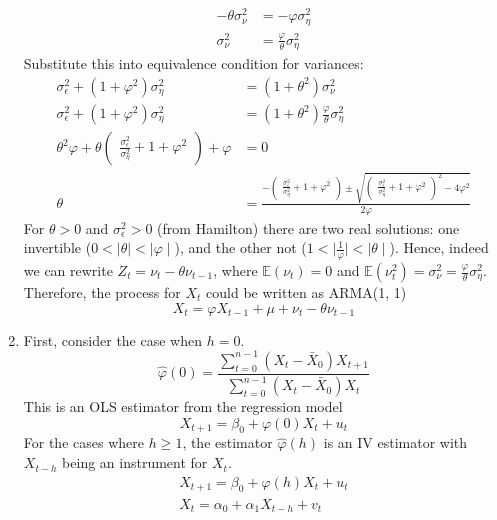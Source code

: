 \documentclass[]{article}
\begin{document}
\begin{enumerate}[label=\alph*)]
\begin{equation}
		\begin{split}
		-\theta\sigma_\nu^2& = -\varphi\sigma_\eta^2 \\ \nonumber
		\sigma_\nu^2& = \frac{\varphi}{\theta}\sigma_\eta^2
		\end{split}
	\end{equation}
	Substitute this into equivalence condition for variances:
	\begin{equation}
		\begin{split}
		\sigma_\epsilon^2 + (1+\varphi^2)\sigma_\eta^2& = (1+\theta^2)\sigma_\nu^2 \\ \nonumber
		\sigma_\epsilon^2 + (1+\varphi^2)\sigma_\eta^2& = (1+\theta^2)\frac{\varphi}{\theta}\sigma_\eta^2 \\
		\theta^2 \varphi + \theta\begin{pmatrix}
		\frac{\sigma_\epsilon^2}{\sigma_\eta^2} + 1 + \varphi^2
		\end{pmatrix} + \varphi& = 0 \\
		\theta& = \frac{-\begin{pmatrix}
			\frac{\sigma_\epsilon^2}{\sigma_\eta^2} + 1 + \varphi^2
			\end{pmatrix} \pm \sqrt{\begin{pmatrix}
				\frac{\sigma_\epsilon^2}{\sigma_\eta^2} + 1 + \varphi^2
				\end{pmatrix}^2 - 4\varphi^2}}{2\varphi}
		\end{split}
	\end{equation}
	For $\theta>0$ and $\sigma_\epsilon^2 > 0$ (from Hamilton) there are two real solutions: one invertible ($0 < \mid\theta\mid < \mid\varphi\mid$), and the other not ($1 < \mid\frac{1}{\varphi}\mid < \mid\theta\mid$). Hence, indeed we can rewrite $Z_t = \nu_t - \theta\nu_{t-1}$, where $\mathbb{E}(\nu_t) = 0$ and $\mathbb{E}(\nu_t^2) = \sigma_\nu^2 = \frac{\varphi}{\theta}\sigma_\eta^2$. Therefore, the process for $X_t$ could be written as ARMA(1, 1)
	\begin{equation}
		X_t = \varphi X_{t-1} + \mu + \nu_t - \theta\nu_{t-1} \nonumber
	\end{equation}
	
	\item First, consider the case when $h = 0$.
	\begin{equation}
		\hat{\varphi}(0) = \frac{\sum\limits_{t = 0}^{n-1}(X_t - \bar{X}_0)X_{t+1}}{\sum\limits_{t = 0}^{n-1}(X_t - \bar{X}_0)X_t}  \nonumber
	\end{equation}
	This is an OLS estimator from the regression model
	\begin{equation}
		X_{t+1} = \beta_0 + \varphi(0) X_t + u_t \nonumber
	\end{equation}
	For the cases where $h\geq1$, the estimator $\hat{\varphi}(h)$ is an IV estimator with $X_{t-h}$ being an instrument for $X_t$.
	\begin{equation}
	\begin{split}
	X_{t+1} = \beta_0 + \varphi(h) X_t + u_t \\\nonumber
	X_t = \alpha_0 + \alpha_1 X_{t-h} + v_t
	\end{split}
	\end{equation}
	

\end{enumerate}
\end{document}
